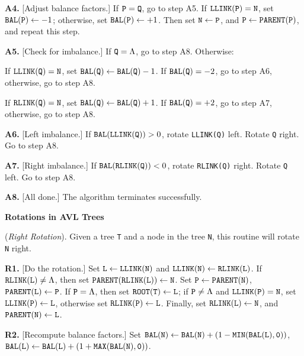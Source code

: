 \item{\bf A4.} [Adjust balance factors.]
If ${\tt P} = {\tt Q}$, go to step A5.
If ${\tt LLINK(P)} = {\tt N}$,
set ${\tt BAL(P)} \gets -1$; otherwise,
set ${\tt BAL(P)} \gets +1$.
Then set ${\tt N} \gets {\tt P}$, and ${\tt P} \gets {\tt PARENT(P)}$,
and repeat this step.

\item{\bf A5.} [Check for imbalance.] If ${\tt Q} = \Lambda$, go to step A8.
Otherwise:

 If ${\tt LLINK(Q)} = {\tt N}$,
set ${\tt BAL(Q)} \gets {\tt BAL(Q)} - 1$.
If ${\tt BAL(Q)} = -2$, go to step A6, otherwise, go to step A8.

 If ${\tt RLINK(Q)} = {\tt N}$,
set ${\tt BAL(Q)} \gets {\tt BAL(Q)} + 1$.
If ${\tt BAL(Q)} = +2$, go to step A7, otherwise, go to step A8.

\item{\bf A6.} [Left imbalance.]
If ${\tt BAL(LLINK(Q))} > 0$, rotate {\tt LLINK(Q)} left. Rotate {\tt Q} right.
Go to step A8.

\item{\bf A7.} [Right imbalance.]
If ${\tt BAL(RLINK(Q))} < 0$, rotate {\tt RLINK(Q)} right. Rotate {\tt Q} left.
Go to step A8.

\item{\bf A8.} [All done.] The algorithm terminates successfully.

\medskip
\parindent=0pt
{\bf Rotations in AVL Trees}

 ({\it Right Rotation}).
Given a tree {\tt T} and a node in the tree {\tt N}, this routine will rotate
{\tt N} right.

\parindent=36pt
\item{\bf R1.} [Do the rotation.]
Set
${\tt L} \gets {\tt LLINK(N)}$ and
${\tt LLINK(N)} \gets {\tt RLINK(L)}$.
If ${\tt RLINK(L)} \neq \Lambda$,
then set ${\tt PARENT(RLINK(L))} \gets {\tt N}$.
Set ${\tt P} \gets {\tt PARENT(N)}$, ${\tt PARENT(L)} \gets {\tt P}$.
If ${\tt P} = \Lambda$, then set ${\tt ROOT(T)} \gets {\tt L}$;
if ${\tt P} \neq \Lambda$ and ${\tt LLINK(P)} = {\tt N}$,
set ${\tt LLINK(P)} \gets {\tt L}$, otherwise
set ${\tt RLINK(P)} \gets {\tt L}$.
Finally, set ${\tt RLINK(L)} \gets {\tt N}$,
and ${\tt PARENT(N)} \gets {\tt L}$.

\item{\bf R2.} [Recompute balance factors.]
Set
${\tt BAL(N)} \gets {\tt BAL(N)} + (1 - {\tt MIN(BAL(L), 0)})$,
${\tt BAL(L)} \gets {\tt BAL(L)} + (1 + {\tt MAX(BAL(N), 0)})$.


